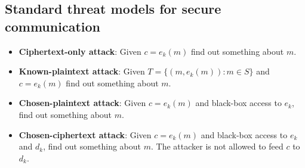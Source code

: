 \subsection{Standard threat models for secure communication}

\begin{itemize}
\item \textbf{Ciphertext-only attack}:
Given $c = e_k(m)$ find out something about $m$.

\item \textbf{Known-plaintext attack}:
Given $T = \{(m, e_k(m)): m \in S\}$ and $c = e_k(m)$ find out something about $m$.

\item \textbf{Chosen-plaintext attack}:
Given $c = e_k(m)$ and black-box access to $e_k$,
find out something about $m$.

\item \textbf{Chosen-ciphertext attack}:
Given $c = e_k(m)$ and black-box access to $e_k$ and $d_k$,
find out something about $m$. The attacker is not allowed to feed $c$ to $d_k$.
\end{itemize}


